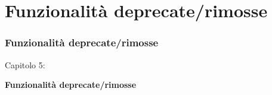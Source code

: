 %

\section{Funzionalità deprecate/rimosse}
\begin{frame}[fragile]
	\frametitle{Funzionalità deprecate/rimosse}

	\begin{center}\huge{Capitolo 5:}\end{center}
	\begin{center}\huge{\color{typo3darkgrey}\textbf{Funzionalità deprecate/rimosse}}\end{center}

\end{frame}

